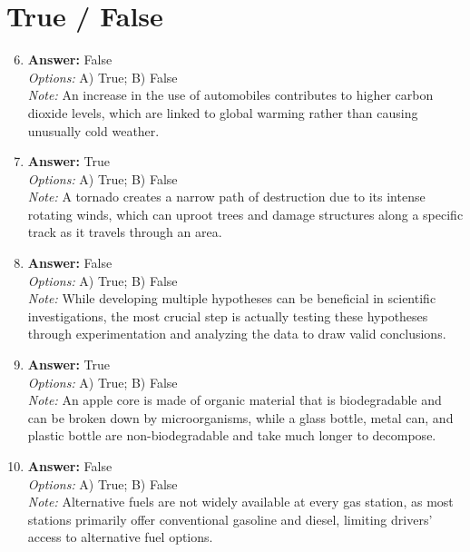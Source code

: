 \documentclass[12pt]{article}
\begin{document}
\section*{True / False}
\begin{enumerate}[label=\arabic*.]
\setcounter{enumi}{5}
\item \textbf{Answer:} False
\\ \textit{Options:} A) True; B) False
\\ \textit{Note:} An increase in the use of automobiles contributes to higher carbon dioxide levels, which are linked to global warming rather than causing unusually cold weather.
\item \textbf{Answer:} True
\\ \textit{Options:} A) True; B) False
\\ \textit{Note:} A tornado creates a narrow path of destruction due to its intense rotating winds, which can uproot trees and damage structures along a specific track as it travels through an area.
\item \textbf{Answer:} False
\\ \textit{Options:} A) True; B) False
\\ \textit{Note:} While developing multiple hypotheses can be beneficial in scientific investigations, the most crucial step is actually testing these hypotheses through experimentation and analyzing the data to draw valid conclusions.
\item \textbf{Answer:} True
\\ \textit{Options:} A) True; B) False
\\ \textit{Note:} An apple core is made of organic material that is biodegradable and can be broken down by microorganisms, while a glass bottle, metal can, and plastic bottle are non-biodegradable and take much longer to decompose.
\item \textbf{Answer:} False
\\ \textit{Options:} A) True; B) False
\\ \textit{Note:} Alternative fuels are not widely available at every gas station, as most stations primarily offer conventional gasoline and diesel, limiting drivers' access to alternative fuel options.
\end{enumerate}
\end{document}
